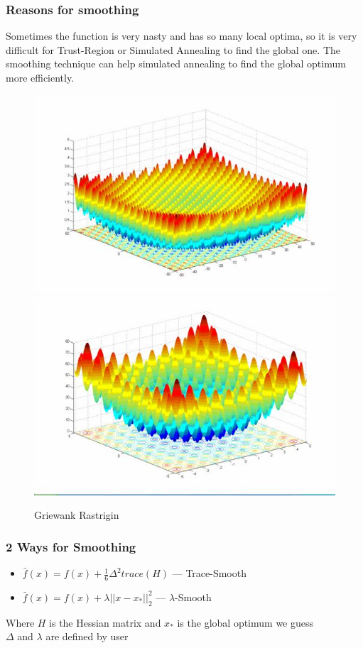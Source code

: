 \documentclass[hyperref={pdfpagelabels=false}]{beamer}
\begin{document}
\begin{frame}
\frametitle{Reasons for smoothing}
Sometimes the function is very nasty and has so many local optima, so it is very difficult for Trust-Region or Simulated Annealing to find the global one. The smoothing technique can help simulated annealing to find the global optimum more efficiently.
\begin{figure}
\includegraphics[scale=0.35]{griewank.jpg}
\includegraphics[scale=0.35]{Rastrigin.jpg}
\caption{Griewank \qquad \qquad \qquad \qquad \quad Rastrigin}
\end{figure}
\end{frame}


\begin{frame}
\frametitle{2 Ways for Smoothing}
\begin{itemize}
\item $\bar{f}(x)=f(x)+\frac{1}{6}\Delta^2trace(H)$  --- Trace-Smooth	
\item $\bar{f}(x)=f(x)+\lambda||x-x_*||_2^2$   --- $\lambda$-Smooth
\end{itemize}
Where $H$ is the Hessian matrix and $x_*$ is the global optimum we guess\\
$\Delta$ and $\lambda$ are defined by user\\
\end{frame}
\end{document}
